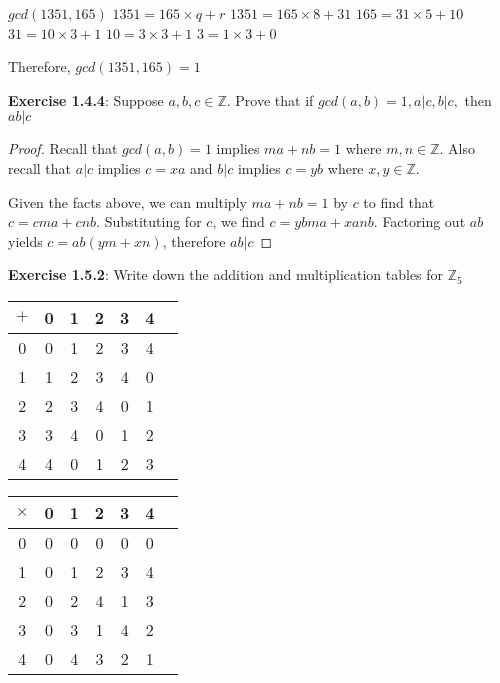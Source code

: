 \documentclass[a4paper]{article}
\begin{document}
\begin{myparindent}{0pt}
$gcd(1351, 165)$ \newline
$1351 = 165 \times q + r$ \newline
$1351 = 165 \times 8 + 31$ \newline
$165 = 31 \times 5 + 10$ \newline
$31 = 10 \times 3 + 1$ \newline
$10 = 3 \times 3 + 1$ \newline
$3 = 1 \times 3 + 0$ \newline

Therefore, $gcd(1351, 165) = 1$ \newline
\newline

\textbf{Exercise 1.4.4}:
Suppose $a, b, c \in \mathbb{Z}$. Prove that if $gcd(a, b) = 1, a|c, b|c,$ then $ab|c$
\begin{proof}
Recall that $gcd(a, b) = 1$ implies $ma + nb = 1$ where $m, n \in \mathbb{Z}$.
Also recall that $a | c$ implies $c = xa$ and $b | c$ implies $c  = yb$
where $x, y \in \mathbb{Z}$.

Given the facts above, we can multiply $ma + nb = 1$ by $c$ to find that
$c = cma + cnb$. Substituting for $c$, we find $c = ybma + xanb$. Factoring out
$ab$ yields $c = ab(ym + xn)$, therefore $ab | c$
\end{proof}

\textbf{Exercise 1.5.2}:
Write down the addition and multiplication tables for $\mathbb{Z}_5$ \newline

\begin{center}
\begin{tabular}{ c| c | c | c | c | c | c |}
$+$ & 0 & 1 & 2 & 3 & 4 \\
\hline
0 & 0 & 1 & 2 & 3 & 4 \\
\hline
1 & 1 & 2 & 3 & 4 & 0 \\
\hline
2 & 2 & 3 & 4 & 0 & 1 \\
\hline
3 & 3 & 4 & 0 & 1 & 2 \\
\hline
4 & 4 & 0 & 1 & 2 & 3 \\
\hline
\end{tabular}
\end{center}

\begin{center}
\begin{tabular}{ c| c | c | c | c | c | c |}
$\times$ & 0 & 1 & 2 & 3 & 4 \\
\hline
0 & 0 & 0 & 0 & 0 & 0 \\
\hline
1 & 0 & 1 & 2 & 3 & 4 \\
\hline
2 & 0 & 2 & 4 & 1 & 3 \\
\hline
3 & 0 & 3 & 1 & 4 & 2 \\
\hline
4 & 0 & 4 & 3 & 2 & 1 \\
\hline
\end{tabular}
\end{center}


\end{myparindent}
\end{document}
